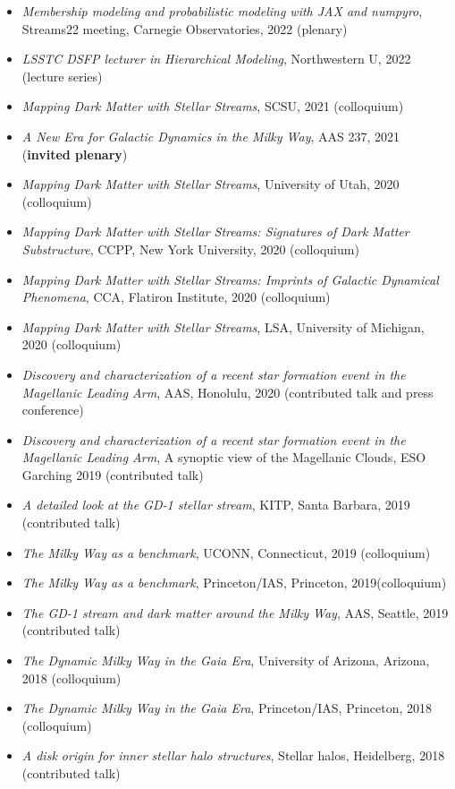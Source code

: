 \documentclass[12pt, letterpaper]{apw-cv}
\begin{document}
\begin{itemize}
    \item \emph{Membership modeling and probabilistic modeling with JAX and numpyro}, Streams22 meeting, Carnegie Observatories, 2022 (plenary)
    \item \emph{LSSTC DSFP lecturer in Hierarchical Modeling}, Northwestern U, 2022 (lecture series)
    \item \emph{Mapping Dark Matter with Stellar Streams}, SCSU, 2021 (colloquium)
    \item \emph{A New Era for Galactic Dynamics in the Milky Way}, AAS 237, 2021 (\textbf{invited plenary})
    \item \emph{Mapping Dark Matter with Stellar Streams}, University of Utah, 2020 (colloquium)
    \item \emph{Mapping Dark Matter with Stellar Streams: Signatures of Dark Matter Substructure}, CCPP, New York University, 2020 (colloquium)
    \item \emph{Mapping Dark Matter with Stellar Streams: Imprints of Galactic Dynamical Phenomena}, CCA, Flatiron Institute, 2020 (colloquium)
    \item \emph{Mapping Dark Matter with Stellar Streams}, LSA, University of Michigan, 2020 (colloquium)
    \item \emph{Discovery and characterization of a recent star formation event in the Magellanic Leading Arm}, AAS, Honolulu, 2020 (contributed talk and press conference)
    \item \emph{Discovery and characterization of a recent star formation event in the Magellanic Leading Arm}, A synoptic view of the Magellanic Clouds, ESO Garching 2019 (contributed talk)
    \item \emph{A detailed look at the GD-1 stellar stream}, KITP, Santa Barbara, 2019 (contributed talk)
    \item \emph{The Milky Way as a benchmark}, UCONN, Connecticut, 2019 (colloquium)
    \item \emph{The Milky Way as a benchmark}, Princeton/IAS, Princeton, 2019(colloquium)
    \item \emph{The GD-1 stream and dark matter around the Milky Way}, AAS, Seattle, 2019 (contributed talk)
    \item \emph{The Dynamic Milky Way in the Gaia Era}, University of Arizona, Arizona, 2018 (colloquium)
    \item \emph{The Dynamic Milky Way in the Gaia Era}, Princeton/IAS, Princeton, 2018 (colloquium)
    \item \emph{A disk origin for inner stellar halo structures}, Stellar halos, Heidelberg, 2018 (contributed talk)

\end{itemize}
\end{document}
